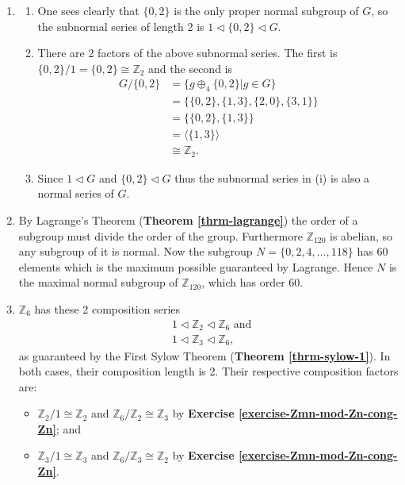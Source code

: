 \begin{enumerate}
    \item \begin{enumerate}[label=(\roman*)]
        \item One sees clearly that $\{0, 2\}$ is the only proper normal subgroup of $G$, so the subnormal series of length 2 is $1 \lhd \{0, 2\} \lhd G$.
        \item There are 2 factors of the above subnormal series. The first is $\{0, 2\} / 1 = \{0, 2\} \cong \mathbb{Z}_2$ and the second is
        \begin{align*}
            G / \{0, 2\} &= \{g \oplus_4 \{0, 2\} \vert g \in G\}\\
            &= \{\{0, 2\}, \{1, 3\}, \{2, 0\}, \{3, 1\}\}\\
            &= \{\{0, 2\}, \{1, 3\}\}\\
            &= \langle \{1, 3\} \rangle\\
            &\cong \mathbb{Z}_2.
        \end{align*}
        \item Since $1 \lhd G$ and $\{0, 2\} \lhd G$ thus the subnormal series in (i) is also a normal series of $G$.
    \end{enumerate}
    
    \item By Lagrange's Theorem (\textbf{Theorem \ref{thrm-lagrange}}) the order of a subgroup must divide the order of the group. Furthermore $\mathbb{Z}_{120}$ is abelian, so any subgroup of it is normal. Now the subgroup $N = \{0, 2, 4, \dots, 118\}$ has 60 elements which is the maximum possible guaranteed by Lagrange. Hence $N$ is the maximal normal subgroup of $\mathbb{Z}_{120}$, which has order 60.
    
    \item $\mathbb{Z}_6$ has these 2 composition series
    \begin{align*}
        &1 \lhd \mathbb{Z}_2 \lhd \mathbb{Z}_6 \text{ and }\\
        &1 \lhd \mathbb{Z}_3 \lhd \mathbb{Z}_6,
    \end{align*}
    as guaranteed by the First Sylow Theorem (\textbf{Theorem \ref{thrm-sylow-1}}). In both cases, their composition length is 2. Their respective composition factors are:
    \begin{itemize}
        \item $\mathbb{Z}_2 / 1 \cong \mathbb{Z}_2$ and $\mathbb{Z}_6 / \mathbb{Z}_2 \cong \mathbb{Z}_3$ by \textbf{Exercise \ref{exercise-Zmn-mod-Zn-cong-Zn}}; and
        \item $\mathbb{Z}_3 / 1 \cong \mathbb{Z}_3$ and $\mathbb{Z}_6 / \mathbb{Z}_3 \cong \mathbb{Z}_2$ by \textbf{Exercise \ref{exercise-Zmn-mod-Zn-cong-Zn}}.
    \end{itemize}
    

\end{enumerate}
